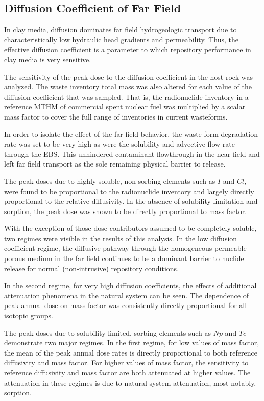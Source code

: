 
\subsection{Diffusion Coefficient of Far Field}
\label{sec:diffusivity}

In clay media, diffusion dominates far field hydrogeologic transport due to 
characteristically low hydraulic head gradients and permeability. Thus, the 
effective diffusion coefficient is a parameter to which repository performance 
in clay media is very sensitive. 

The sensitivity of the peak dose to the diffusion coefficient in the 
host rock was analyzed. 
The waste inventory total mass was also altered for each value of the diffusion  
coefficient that was sampled. That is, the radionuclide inventory in a reference 
\gls{MTHM} of commercial spent nuclear fuel was multiplied by a scalar mass factor 
to cover the full range of inventories in current wasteforms.

In order to isolate the effect of the far field behavior, the waste form 
degradation rate was set to be very high as were the solubility and advective 
flow rate through the  \gls{EBS}. This unhindered contaminant flowthrough 
in the near field and left far field transport as the sole remaining physical 
barrier to release.

The peak doses due to highly soluble, non-sorbing elements such as $I$ and $Cl$, 
were found to be proportional to the radionuclide inventory and 
largely directly proportional to the relative diffusivity. In the absence of 
solubility limitation and sorption, the peak dose was shown to be directly 
proportional to mass factor. 

With the exception of those dose-contributors assumed to be completely soluble, 
two regimes were visible in the results of this analysis. In the low diffusion 
coefficient regime, the diffusive pathway through the homogeneous permeable 
porous medium in the far field continues to be a  dominant barrier to nuclide 
release for normal (non-intrusive) repository conditions. 

In the second regime, for very high diffusion coefficients, the effects of 
additional attenuation phenomena in the natural system can be seen.  The 
dependence of peak annual dose on mass factor was consistently directly 
proportional for all isotopic groups.

The peak doses due to solubility limited, sorbing elements such as $Np$ and 
$Tc$ demonstrate two major regimes. In the first regime, for 
low values of mass factor, the mean of the peak annual dose rates is directly 
proportional to both reference diffusivity and mass factor.  For higher values 
of mass factor, the sensitivity to reference diffusivity and mass factor are 
both attenuated at higher values.  The attenuation in these regimes 
is due to natural system attenuation, most notably, sorption.

